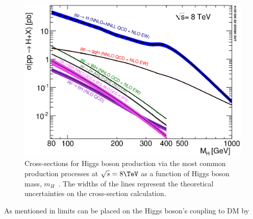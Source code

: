 \begin{figure}
  \includegraphics[width=\largefigwidth]{plots/theory/XS_8TeV.eps}
  \caption{Cross-sections for Higgs boson production via the most common production processes at $\sqrt{s}=8 \TeV$ as a function of Higgs boson mass, $m_{H}$~\cite{Heinemeyer:1559921}. The widths of the lines represent the theoretical uncertainties on the cross-section calculation.}
  \label{fig:smprod}
\end{figure}

As mentioned in  limits can be placed on the Higgs boson's coupling to \ac{DM} by %


